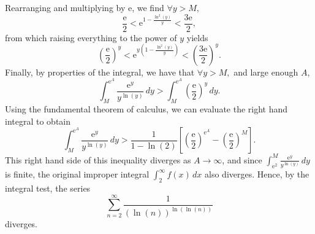 \documentclass[
  12pt,
  a4paper]{extarticle}
\theoremstyle{plain}
\theoremstyle{definition}
\theoremstyle{plain}
\theoremstyle{plain}
\theoremstyle{plain}
\theoremstyle{plain}
\theoremstyle{definition}
\theoremstyle{definition}
\theoremstyle{remark}
\theoremstyle{remark}
\renewcommand{\;}{\,}
\begin{document}
Rearranging and multiplying by \(\mathrm{e}\), we find \(\forall y > M,\) \[\frac{\mathrm{e}}{2} < \mathrm{e}^{1 - \frac{\ln^2(y)}{y}} < \frac{3\mathrm{e}}{2},\] from which raising everything to the power of \(y\) yields \[\left(\frac{\mathrm{e}}{2}\right)^y < \mathrm{e}^{y\left(1 - \frac{\ln^2(y)}{y}\right)} < \left(\frac{3\mathrm{e}}{2}\right)^y.\] Finally, by properties of the integral, we have that \(\forall y > M,\) and large enough \(A\), \[\int_{M}^{\mathrm{e}^A}\frac{\mathrm{e}^y}{y^{\ln(y)}}\;dy > \int_M^{\mathrm{e}^A}\left(\frac{\mathrm{e}}{2}\right)^y\;dy.\] Using the fundamental theorem of calculus, we can evaluate the right hand integral to obtain \[\int_{M}^{\mathrm{e}^A}\frac{\mathrm{e}^y}{y^{\ln(y)}}\;dy > \frac{1}{1 - \ln(2)}\left[\left(\frac{\mathrm{e}}{2}\right)^{\mathrm{e}^A} - \left(\frac{\mathrm{e}}{2}\right)^{M} \right].\] This right hand side of this inequality diverges as \(A \to \infty\), and since \(\int_{\mathrm{e}^2}^M \frac{\mathrm{e}^y}{y^{\ln(y)}}\;dy\) is finite, the original improper integral \(\int_{2}^{\infty} f(x)\;dx\) also diverges. Hence, by the integral test, the series \[\sum_{n=2}^{\infty}\frac{1}{(\ln(n))^{\ln(\ln(n))}}\] diverges.
\end{document}
